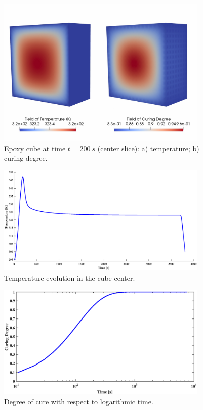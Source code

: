 \begin{figure}[h!]
	\centering
	\includegraphics[width=0.9\textwidth]{obrazky/curing_temperature.jpg}
	\caption[Epoxy cube]{Epoxy cube at time $t=200~s$ (center slice): a) temperature; b) curing degree.}\label{obr:Curing_cube}
\end{figure}



\begin{figure}[h!]
	\centering
	\includegraphics[width=0.9\textwidth]{obrazky/T-t.eps}
	\caption[Temperature evolution]{Temperature evolution in the cube center.}\label{obr:Curing_temperature}
\end{figure}

\begin{figure}[h!]
	\centering
	\includegraphics[width=0.9\textwidth]{obrazky/CD-t.eps}
	\caption[Degree of cure with respect to time]{Degree of cure with respect to logarithmic time.}\label{obr:Curing_curing}
\end{figure}

